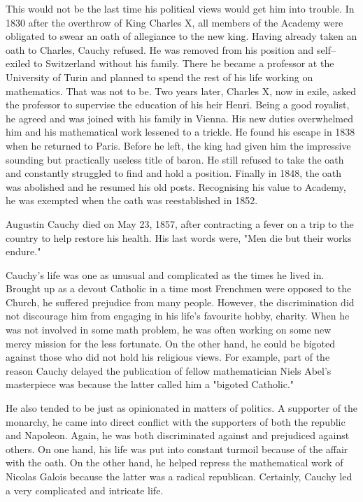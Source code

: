 This would not be the last time his political views would get him into trouble.
In 1830 after the overthrow of King Charles X, all members of the Academy were
obligated to swear an oath of allegiance to the new king. Having already taken
an oath to Charles, Cauchy refused. He was removed from his position and
self--exiled to Switzerland without his family. There he became a professor at
the University of Turin and planned to spend the rest of his life working on
mathematics. That was not to be. Two years later, Charles X, now in exile, asked
the professor to supervise the education of his heir Henri. Being a good
royalist, he agreed and was joined with his family in Vienna. His new duties
overwhelmed him and his mathematical work lessened to a trickle. He found his
escape in 1838 when he returned to Paris. Before he left, the king had given him
the impressive sounding but practically useless title of baron. He still refused
to take the oath and constantly struggled to find and hold a position. Finally
in 1848, the oath was abolished and he resumed his old posts. Recognising his
value to Academy, he was exempted when the oath was reestablished in 1852.


Augustin Cauchy died on May 23, 1857, after contracting a fever on a trip to the
country to help restore his health. His last words were, "Men die but their
works endure."


Cauchy's life was one as unusual and complicated as the times he lived in.
Brought up as a devout Catholic in a time most Frenchmen were opposed to the
Church, he suffered prejudice from many people. However, the discrimination did
not discourage him from engaging in his life's favourite hobby, charity. When he
was not involved in some math problem, he was often working on some new mercy
mission for the less fortunate. On the other hand, he could be bigoted against
those who did not hold his religious views. For example, part of the reason
Cauchy delayed the publication of fellow mathematician Niels Abel's masterpiece
was because the latter called him a "bigoted Catholic."


He also tended to be just as opinionated in matters of politics. A supporter of
the monarchy, he came into direct conflict with the supporters of both the
republic and Napoleon. Again, he was both discriminated against and prejudiced
against others. On one hand, his life was put into constant turmoil because of
the affair with the oath. On the other hand, he helped repress the mathematical
work of Nicolas Galois because the latter was a radical republican. Certainly,
Cauchy led a very complicated and intricate life.


